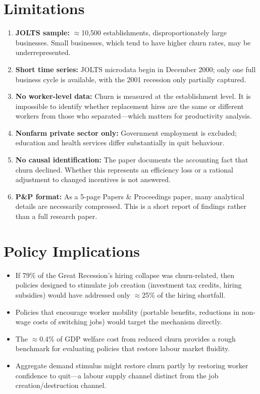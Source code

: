 \section{Limitations}

\begin{enumerate}
  \item \textbf{JOLTS sample:} $\approx$10,500 establishments, disproportionately
    large businesses. Small businesses, which tend to have higher churn rates,
    may be underrepresented.
  \item \textbf{Short time series:} JOLTS microdata begin in December 2000;
    only one full business cycle is available, with the 2001 recession only
    partially captured.
  \item \textbf{No worker-level data:} Churn is measured at the establishment
    level. It is impossible to identify whether replacement hires are the same
    or different workers from those who separated---which matters for
    productivity analysis.
  \item \textbf{Nonfarm private sector only:} Government employment is
    excluded; education and health services differ substantially in quit
    behaviour.
  \item \textbf{No causal identification:} The paper documents the accounting
    fact that churn declined. Whether this represents an efficiency loss or
    a rational adjustment to changed incentives is not answered.
  \item \textbf{P\&P format:} As a 5-page Papers \& Proceedings paper, many
    analytical details are necessarily compressed. This is a short report of
    findings rather than a full research paper.
\end{enumerate}

\section{Policy Implications}

\begin{itemize}
  \item If 79\% of the Great Recession's hiring collapse was churn-related,
    then policies designed to stimulate job creation (investment tax credits,
    hiring subsidies) would have addressed only $\approx$25\% of the hiring
    shortfall.
  \item Policies that encourage worker mobility (portable benefits, reductions
    in non-wage costs of switching jobs) would target the mechanism directly.
  \item The $\approx$0.4\% of GDP welfare cost from reduced churn provides a
    rough benchmark for evaluating policies that restore labour market
    fluidity.
  \item Aggregate demand stimulus might restore churn partly by restoring
    worker confidence to quit---a labour supply channel distinct from the job
    creation/destruction channel.
\end{itemize}

